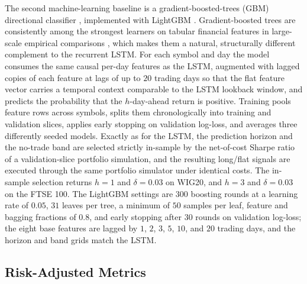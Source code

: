 \documentclass{ieeeaccess}
\newcommand{\GBMhorizon}{\ensuremath{1}}
\newcommand{\GBMband}{\ensuremath{0.03}}
\newcommand{\FtseGBMhorizon}{\ensuremath{3}}
\newcommand{\FtseGBMband}{\ensuremath{0.03}}
\begin{document}
The second machine-learning baseline is a gradient-boosted-trees (GBM) directional classifier \cite{friedman2001}, implemented with LightGBM \cite{ke2017lightgbm}. Gradient-boosted trees are consistently among the strongest learners on tabular financial features in large-scale empirical comparisons \cite{krauss2017,gukellyxiu2020}, which makes them a natural, structurally different complement to the recurrent LSTM. For each symbol and day the model consumes the same causal per-day features as the LSTM, augmented with lagged copies of each feature at lags of up to $20$ trading days so that the flat feature vector carries a temporal context comparable to the LSTM lookback window, and predicts the probability that the $h$-day-ahead return is positive. Training pools feature rows across symbols, splits them chronologically into training and validation slices, applies early stopping on validation log-loss, and averages three differently seeded models. Exactly as for the LSTM, the prediction horizon and the no-trade band are selected strictly in-sample by the net-of-cost Sharpe ratio of a validation-slice portfolio simulation, and the resulting long/flat signals are executed through the same portfolio simulator under identical costs. The in-sample selection returns $h = \GBMhorizon$ and $\delta = \GBMband$ on WIG20, and $h = \FtseGBMhorizon$ and $\delta = \FtseGBMband$ on the FTSE 100. The LightGBM settings are $300$ boosting rounds at a learning rate of $0.05$, $31$ leaves per tree, a minimum of $50$ samples per leaf, feature and bagging fractions of $0.8$, and early stopping after $30$ rounds on validation log-loss; the eight base features are lagged by $1$, $2$, $3$, $5$, $10$, and $20$ trading days, and the horizon and band grids match the LSTM.

\subsection{Risk-Adjusted Metrics}
\label{subsec:metrics}
\end{document}
